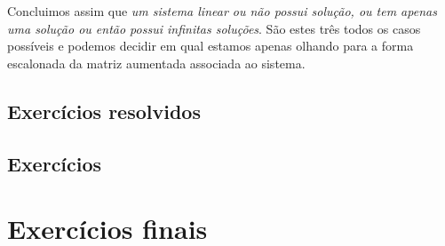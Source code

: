 \documentclass[../livro.tex]{subfiles} %
\begin{document}
Concluimos assim que \textit{um sistema linear ou não possui solução, ou tem apenas uma solução ou então possui infinitas soluções}. São estes três todos os casos possíveis e podemos decidir em qual estamos apenas olhando para a forma escalonada da matriz aumentada associada ao sistema.

\subsection*{Exercícios resolvidos}

\construirExeresol

\subsection*{Exercícios}

\construirExer

\section{Exercícios finais}

\construirExer
\end{document}
